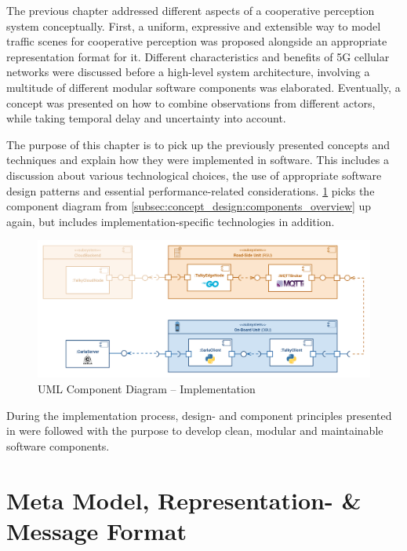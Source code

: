 The previous chapter addressed different aspects of a cooperative perception system conceptually. First, a uniform, expressive and extensible way to model traffic scenes for cooperative perception was proposed alongside an appropriate representation format for it. Different characteristics and benefits of 5G cellular networks were discussed before a high-level system architecture, involving a multitude of different modular software components was elaborated. Eventually, a concept was presented on how to combine observations from different actors, while taking temporal delay and uncertainty into account. 
\par
\bigskip

The purpose of this chapter is to pick up the previously presented concepts and techniques and explain how they were implemented in software. This includes a discussion about various technological choices, the use of appropriate software design patterns and essential performance-related considerations. \cref{fig:components_full} picks the component diagram from \cref{subsec:concept_design:components_overview} up again, but includes implementation-specific technologies in addition. 

\begin{figure}[h]
	\centering
	\includegraphics[width=1\linewidth]{98_images/components_full}
	\caption{UML Component Diagram – Implementation}
	\label{fig:components_full}
\end{figure}
\par
\bigskip

During the implementation process, design- and component principles presented in \cite{Martin2017} were followed with the purpose to develop clean, modular and maintainable software components.

\section{Meta Model, Representation- \& Message Format}
\label{sec:implementation:meta_model_representation_message_format}

